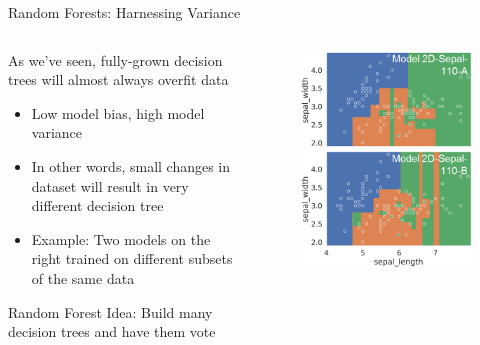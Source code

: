 \documentclass[aspectratio=169]{../latex_main/tntbeamer}  %
\begin{document}
		\begin{frame}{Random Forests: Harnessing Variance}
	    \begin{columns}
	        \begin{column}{.5\textwidth}
	                As we’ve seen, fully-grown decision trees will almost always overfit data
	                \begin{itemize}
	                    \item Low model bias, high model variance
	                    \item In other words, small changes in dataset will result in very different decision tree
	                    \item Example: Two models on the right trained on different subsets of the same data
	                \end{itemize}
	                
	                Random Forest Idea: Build many decision trees and have them vote
	        \end{column}
	        
	        \begin{column}{.5\textwidth}
	                \begin{figure}
	                    \centering
	                    \includegraphics[scale=.35]{Bild55}
	                \end{figure}
	        \end{column}
	    \end{columns}
	\end{frame}
	
\end{document}
